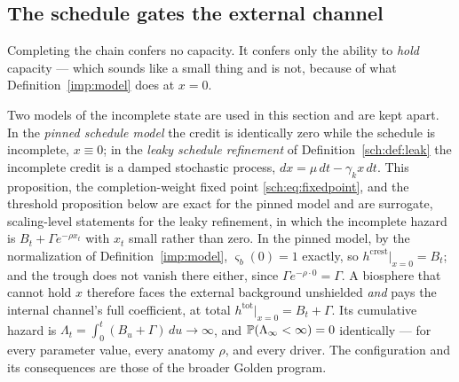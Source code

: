 \subsection{The schedule gates the external channel}
\label{sch:subsub:gating}

Completing the chain confers no capacity. It confers only the ability to
\emph{hold} capacity --- which sounds like a small thing and is not,
because of what Definition~\ref{imp:model} does at $x=0$.

\begin{proposition}\label{sch:prop:gating}
Two models of the incomplete state are used in this section and are
kept apart. In the \emph{pinned schedule model} the credit is
identically zero while the schedule is incomplete, $x\equiv0$; in the
\emph{leaky schedule refinement} of Definition~\ref{sch:def:leak} the
incomplete credit is a damped stochastic process, $dx=\mu\,dt-\gamma_kx\,dt$.
This proposition, the completion-weight fixed point
\eqref{sch:eq:fixedpoint}, and the threshold proposition below are
exact for the pinned model and are surrogate, scaling-level statements
for the leaky refinement, in which the incomplete hazard is
$B_t+\Gamma e^{-\rho x_t}$ with $x_t$ small rather than zero. In the
pinned model, by the normalization of Definition~\ref{imp:model},
$\varsigma_b(0)=1$ exactly, so $h^{\mathrm{crest}}\big|_{x=0}=B_t$; and the trough does not
vanish there either, since $\Gamma e^{-\rho\cdot0}=\Gamma$. A biosphere
that cannot hold $x$ therefore faces the external background unshielded
\emph{and} pays the internal channel's full coefficient, at total
$h^{\mathrm{tot}}\big|_{x=0}=B_t+\Gamma$. Its cumulative hazard is
$\Lambda_t=\int_0^t(B_u+\Gamma)\,du\to\infty$, and
$\mathbb{P}(\Lambda_\infty<\infty)=0$ identically --- for every parameter
value, every anatomy $\rho$, and every driver. The configuration and its
consequences are those of the broader Golden program.
\end{proposition}

